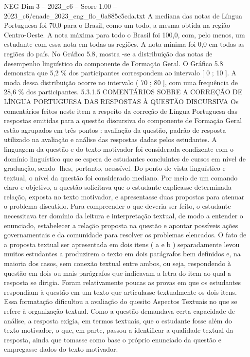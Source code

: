 \begin{textsample}{NEG Dim 3 – 2023\_c6 – Score 1.00 – 2023\_c6/enade\_2023\_eng\_flo\_0a885c5cda.txt}
A mediana das notas de Língua Portuguesa foi 70,0 para o Brasil, como um todo, a mesma obtida na região Centro-Oeste.
A nota máxima para todo o Brasil foi 100,0, com, pelo menos, um estudante com essa nota em todas as regiões.
A nota mínima foi 0,0 em todas as regiões do país.
No Gráfico 5.8, mostra -se a distribuição das notas de desempenho linguístico do componente de Formação Geral.
O Gráfico 5.8 demonstra que 5,2 \% dos participantes correspondem ao intervalo [ 0 ; 10 ].
A moda dessa distribuição ocorre no intervalo ( 70 ; 80 ], com uma frequência de 28,6 \% dos participantes. 5.3.1.5 COMENTÁRIOS SOBRE A CORREÇÃO DE LÍNGUA PORTUGUESA DAS RESPOSTAS À QUESTÃO DISCURSIVA Os comentários feitos neste item a respeito da correção de Língua Portuguesa das respostas emitidas para a questão discursiva do componente de Formação Geral estão agrupados em três pontos : avaliação da questão, padrão de resposta utilizado na avaliação e análise das respostas dadas pelos estudantes.
A linguagem da questão e do texto motivador foi considerada condizente com o domínio linguístico que se espera de estudantes concluintes de cursos em nível de graduação, sendo -lhes, portanto, acessível.
Do ponto de vista linguístico e textual, o nível da questão foi considerado mediano.
Por meio de um comando claro e objetivo, a questão solicitava que o estudante explicasse determinada relação, exposta no texto motivador, e apresentasse duas propostas para atenuar o problema discutido.
Para compreender o que deveria ser feito, o estudante necessitava ter domínio da leitura e interpretação textual, de modo a entender o enunciado, estabelecer a relação proposta na questão e apontar possíveis ações governamentais e da comunidade para resolver os problemas elencados.
O fato de a proposta textual ser apresentada em dois itens ( a e b ) separadamente levou muitos estudantes a produzirem o texto em dois parágrafos bem definidos e, na maioria dos casos, sem conexão textual entre ambos, ou seja, respondendo à questão em dois ou mais parágrafos que indicavam a letra do item ao qual a resposta se dirigia.
Foram relativamente poucas as provas em que os estudantes respondiam à questão em um texto que articulasse textualmente os dois itens.
Essa formatação dificultou a avaliação do quesito Aspectos Textuais no que se refere à organização textual.
Como a questão demandava certa capacidade de análise, a resposta exigia, em termos textuais, que o estudante fosse além do texto motivador, o que, em parte, passou a identificar a qualidade textual da resposta, ainda que tomasse como base o próprio enunciado da questão e empregasse dados do texto motivador.

\end{textsample}
